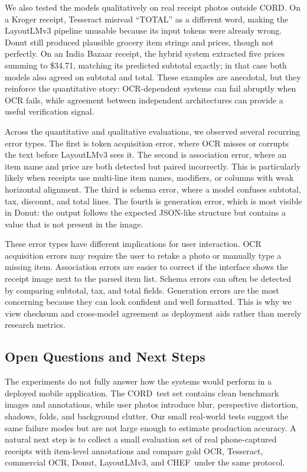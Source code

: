 \documentclass[9pt,twocolumn,twoside]{extarticle}
\newcommand{\cord}{\textsc{CORD}}
\newcommand{\chef}{\textsc{CHEF}}
\begin{document}
We also tested the models qualitatively on real receipt photos outside \cord. On a Kroger receipt, Tesseract misread ``TOTAL'' as a different word, making the LayoutLMv3 pipeline unusable because its input tokens were already wrong. Donut still produced plausible grocery item strings and prices, though not perfectly. On an India Bazaar receipt, the hybrid system extracted five prices summing to \$34.71, matching its predicted subtotal exactly; in that case both models also agreed on subtotal and total. These examples are anecdotal, but they reinforce the quantitative story: OCR-dependent systems can fail abruptly when OCR fails, while agreement between independent architectures can provide a useful verification signal.

Across the quantitative and qualitative evaluations, we observed several recurring error types. The first is token acquisition error, where OCR misses or corrupts the text before LayoutLMv3 sees it. The second is association error, where an item name and price are both detected but paired incorrectly. This is particularly likely when receipts use multi-line item names, modifiers, or columns with weak horizontal alignment. The third is schema error, where a model confuses subtotal, tax, discount, and total lines. The fourth is generation error, which is most visible in Donut: the output follows the expected JSON-like structure but contains a value that is not present in the image.

These error types have different implications for user interaction. OCR acquisition errors may require the user to retake a photo or manually type a missing item. Association errors are easier to correct if the interface shows the receipt image next to the parsed item list. Schema errors can often be detected by comparing subtotal, tax, and total fields. Generation errors are the most concerning because they can look confident and well formatted. This is why we view checksum and cross-model agreement as deployment aids rather than merely research metrics.

\subsection{Open Questions and Next Steps}
\label{sec:next}

The experiments do not fully answer how the systems would perform in a deployed mobile application. The \cord\ test set contains clean benchmark images and annotations, while user photos introduce blur, perspective distortion, shadows, folds, and background clutter. Our small real-world tests suggest the same failure modes but are not large enough to estimate production accuracy. A natural next step is to collect a small evaluation set of real phone-captured receipts with item-level annotations and compare gold OCR, Tesseract, commercial OCR, Donut, LayoutLMv3, and \chef\ under the same protocol.
\end{document}
